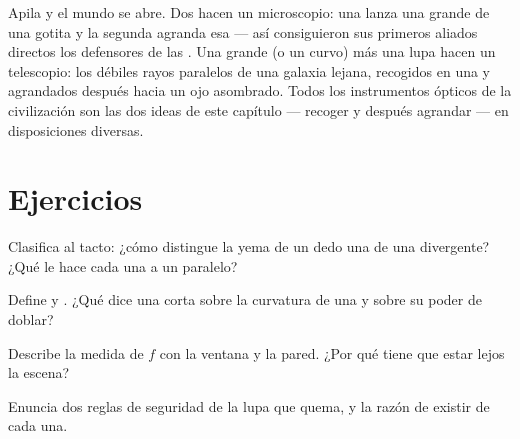 \begin{remark}\label{rem:g8:lenses-images:instruments}
Apila  y el mundo se abre. Dos  hacen un
microscopio: una lanza una  grande de una gotita y la
segunda agranda esa  --- así consiguieron sus primeros
aliados directos los defensores de las . Una
 grande (o un  curvo) más una lupa hacen un
telescopio: los débiles rayos paralelos de una galaxia lejana,
recogidos en una  y agrandados después hacia un ojo
asombrado. Todos los instrumentos ópticos de la civilización son las
dos ideas de este capítulo --- recoger y después agrandar --- en
disposiciones diversas.
\end{remark}

\section{Ejercicios}

\begin{exercise}[$\star$]\label{exo:g8:lenses-images:1}
Clasifica al tacto: ¿cómo distingue la yema de un dedo una  de una divergente? ¿Qué le hace cada una a un
 paralelo?
\end{exercise}

\begin{exercise}[$\star$]\label{exo:g8:lenses-images:2}
Define  y . ¿Qué dice una
 corta sobre la curvatura de una
 y sobre su poder de doblar?
\end{exercise}

\begin{exercise}[$\star$]\label{exo:g8:lenses-images:3}
Describe la medida de $f$ con la ventana y la pared. ¿Por qué tiene que
estar lejos la escena?
\end{exercise}

\begin{exercise}[$\star$]\label{exo:g8:lenses-images:4}
Enuncia dos reglas de seguridad de la lupa que quema, y la razón de
existir de cada una.
\end{exercise}


